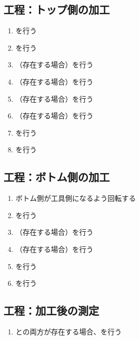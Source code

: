 \subsection{工程：トップ側の加工}
\begin{enumerate}[label*=\sarrow]
\item \DimpleMilling を行う
\item \TopEndFacecutMilling を行う
\item （存在する場合）\TopOutcutMilling を行う
\item （存在する場合）\TopCurvedOutcutMilling を行う
\item （存在する場合）\EndFaceBoringMilling を行う
\item （存在する場合）\IncutBoringMilling を行う
\item \TopEndFaceOutCChamferMilling を行う
\item \TopEndFaceInCChamferMilling を行う
\end{enumerate}


\clearpage
\subsection{工程：ボトム側の加工}
\begin{enumerate}[label*=\sarrow]
\item ボトム側が工具側になるよう回転する
\item \BottomEndFacecutMilling を行う
\item （存在する場合）\BottomOutcutMilling を行う
\item （存在する場合）\BottomCurvedOutcutMilling を行う
\item \BottomEndFaceOutCChamferMilling を行う
\item \BottomEndFaceInCChamferMilling を行う
\end{enumerate}


\subsection{工程：加工後の測定}
\begin{enumerate}[label*=\sarrow]
\item \TopOutcut と\BottomOutcut の両方が存在する場合、\CenterlineEndFaceDifMeasurement を行う
\end{enumerate}


